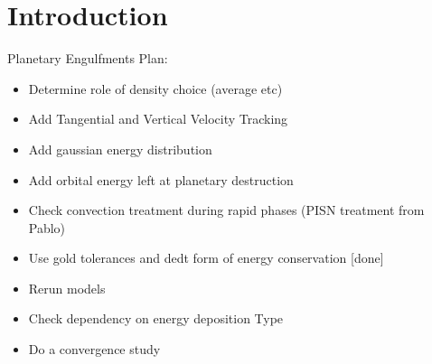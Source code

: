 \documentclass[twocolumn]{aastex62}
\newcommand{\code}[1]{\texttt{#1}}
\newcommand{\mesa}{\code{MESA}}
\newcommand{\MESA}{\mesa}
\begin{document}
\begin{abstract}
Many sun-like stars have planets orbiting in close enough orbits to be engulfed when their host stars ascend the giant branch.  We present one dimensional calculations of planetary engulfments using the Modules for Experiments in Stellar Astrophysics (\MESA) software instrument. 
When a planet enters the stellar envelope, orbital energy is dissipated via hydrodynamic or gravitational drag. We self-consistently track the orbital evolution of the engulfed planet, and the corresponding energy injection. We determine the maximum depth of planetary engulfment assuming disruption occurs when the ram pressure integrated over the cross section of the planet approaches its binding energy. The dissipation of orbital energy in the stellar envelope can change the entropy profile of the star and temporarily shut-off convection. This can have important consequence for the stellar ability to transport the injected energy outwards. 
Our calculations allow to follow the evolution of stellar structure and luminosity of the primary star, and while providing only a rough approximations of the complex engulfment process, unlike multi-dimensional calculations they can be used to rapidly span the vast parameter space of star-planet systems. The results we present outline the parameter space on the giant branch where interaction with planetary companions leads to significant energetic perturbations of host stars. Stellar transients with duration of xx months and brightness changes of up to yy magnitudes  are expected in the subgiant and lower  giant branch. On the other hand rocky planets or planets on distant orbits, lead to minor perturbations of their host stars. 
We tentatively discuss rates and detectability of such events by transient surveys like ZTF and the Vera Rubin Observatory / LSST. 
\end{abstract}  

\keywords{}

\section{Introduction}\label{sec:introduction}

Planetary Engulfments Plan:

\begin{itemize}
    \item Determine role of density choice (average etc)
    \item Add Tangential and Vertical Velocity Tracking
    \item Add gaussian energy distribution
    \item Add orbital energy left at planetary destruction
    \item Check convection treatment during rapid phases (PISN treatment from Pablo)
    \item Use gold tolerances and dedt form of energy conservation [done]
    \item Rerun models
    \item Check dependency on energy deposition Type 
    \item Do a convergence study
\end{itemize}
\end{document}
